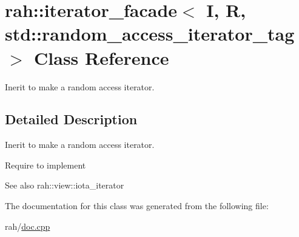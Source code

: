 \hypertarget{classrah_1_1iterator__facade_3_01_i_00_01_r_00_01std_1_1random__access__iterator__tag_01_4}{}\section{rah\+::iterator\+\_\+facade$<$ I, R, std\+::random\+\_\+access\+\_\+iterator\+\_\+tag $>$ Class Reference}
\label{classrah_1_1iterator__facade_3_01_i_00_01_r_00_01std_1_1random__access__iterator__tag_01_4}


Inerit to make a random access iterator.  




\subsection{Detailed Description}
Inerit to make a random access iterator. 

Require to implement 
\begin{DoxyCode}{0}
\end{DoxyCode}
 \begin{DoxySeeAlso}{See also}
rah\+::view\+::iota\+\_\+iterator 
\end{DoxySeeAlso}


The documentation for this class was generated from the following file\+:\begin{DoxyCompactItemize}
\item 
rah/\mbox{\hyperlink{doc_8cpp}{doc.\+cpp}}\end{DoxyCompactItemize}
